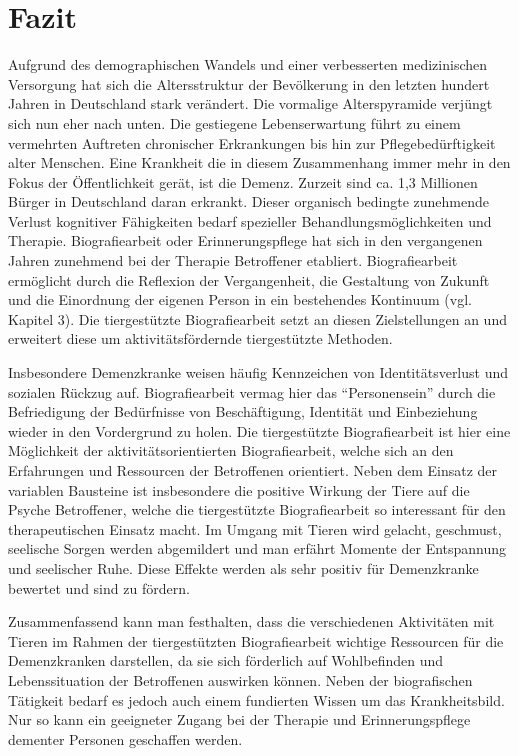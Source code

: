 \section{Fazit}
\label{sec:k5_Fazit}

Aufgrund des demographischen Wandels und einer verbesserten medizinischen Versorgung hat sich die Altersstruktur der Bevölkerung in den letzten hundert Jahren in Deutschland stark verändert. Die vormalige Alterspyramide verjüngt sich nun eher nach unten. Die gestiegene Lebenserwartung führt zu einem vermehrten Auftreten chronischer Erkrankungen bis hin zur Pﬂegebedürftigkeit alter Menschen. Eine Krankheit die in diesem Zusammenhang immer mehr in den Fokus der Öffentlichkeit gerät, ist die Demenz. Zurzeit sind ca. 1,3 Millionen Bürger in Deutschland daran erkrankt. Dieser organisch bedingte zunehmende Verlust kognitiver Fähigkeiten bedarf spezieller Behandlungsmöglichkeiten und Therapie. Biografiearbeit oder Erinnerungspflege hat sich in den vergangenen Jahren zunehmend bei der Therapie Betroffener etabliert. Biografiearbeit ermöglicht durch die Reflexion der Vergangenheit, die Gestaltung von Zukunft und die Einordnung der eigenen Person in ein bestehendes Kontinuum (vgl. Kapitel 3). Die tiergestützte Biografiearbeit setzt an diesen Zielstellungen an und erweitert diese um aktivitätsfördernde tiergestützte Methoden.

Insbesondere Demenzkranke weisen häufig Kennzeichen von Identitätsverlust und sozialen Rückzug auf. Biografiearbeit vermag hier das "`Personensein"' durch die Befriedigung der Bedürfnisse von Beschäftigung, Identität und Einbeziehung wieder in den Vordergrund zu holen. Die tiergestützte Biografiearbeit ist hier eine Möglichkeit der aktivitätsorientierten Biografiearbeit, welche sich an den Erfahrungen und Ressourcen der Betroffenen orientiert. Neben dem Einsatz der variablen Bausteine ist insbesondere die positive Wirkung der Tiere auf die Psyche Betroffener, welche die tiergestützte Biografiearbeit so interessant für den therapeutischen Einsatz macht. Im Umgang mit Tieren wird gelacht, geschmust, seelische Sorgen werden abgemildert und man erfährt Momente der Entspannung und seelischer Ruhe. Diese Effekte werden als sehr positiv für Demenzkranke bewertet und sind zu fördern. 

Zusammenfassend kann man festhalten, dass die verschiedenen Aktivitäten mit Tieren im Rahmen der tiergestützten Biografiearbeit wichtige Ressourcen für die Demenzkranken darstellen, da sie sich förderlich auf Wohlbefinden und Lebenssituation der Betroffenen auswirken können. Neben der biografischen Tätigkeit bedarf es jedoch auch einem fundierten Wissen um das Krankheitsbild. Nur so kann ein geeigneter Zugang bei der Therapie und Erinnerungspflege dementer Personen geschaffen werden.

